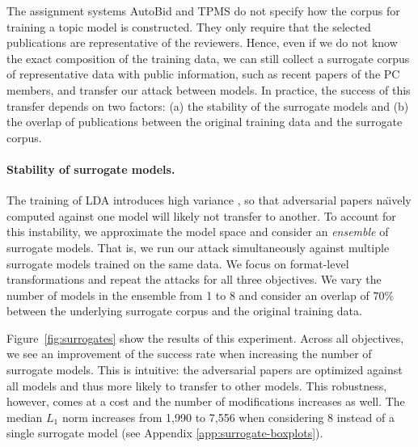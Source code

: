 \documentclass[letterpaper,twocolumn,10pt]{article}
\begin{document}
The assignment systems AutoBid and TPMS do not specify how the corpus for training a topic model is constructed. They only require that the selected publications are representative of the reviewers. Hence, even if we do not know the exact composition of the training data, we can still collect a {surrogate\EndAccSupp{}} corpus of representative data with public information, such as recent papers of the PC members, and transfer our attack between models. In practice, the success of this transfer depends on two factors: (a) the stability of the {surrogate\EndAccSupp{}} models and (b) the overlap of publications between the original training data and the {surrogate\EndAccSupp{}} corpus.

\paragraph{Stability of surrogate models.}
The training of {LDA\EndAccSupp{}} introduces high variance \cite{agrawal-18-what, mantyla-18-measuring}, so that adversarial papers na\"\i vely computed against one model will likely not transfer to another. To account for this {instability\EndAccSupp{}}, we approximate the model space and consider an \emph{ensemble} of {surrogate\EndAccSupp{}} models.
That is, we run our attack simultaneously against multiple {surrogate\EndAccSupp{}} models trained on the same data. We focus on format-level transformations and repeat the attacks for all three objectives. We vary the number of models in the {ensemble\EndAccSupp{}} from 1 to 8 and consider an overlap of 70\% between the underlying {surrogate\EndAccSupp{}} corpus and the original training data.

Figure~\ref{fig:surrogates} show the results of this experiment. Across all objectives, we see an improvement of the success rate when increasing the number of {surrogate\EndAccSupp{}} models. This is intuitive: the adversarial papers are optimized against all models and thus more likely to transfer to other models.
This robustness, however, comes at a cost and the number of modifications increases as well. The median $L_1$ norm increases from 1,990 to 7,556 when considering 8 instead of a single {surrogate\EndAccSupp{}} model (see Appendix \ref{app:surrogate-boxplots}). 
\end{document}
